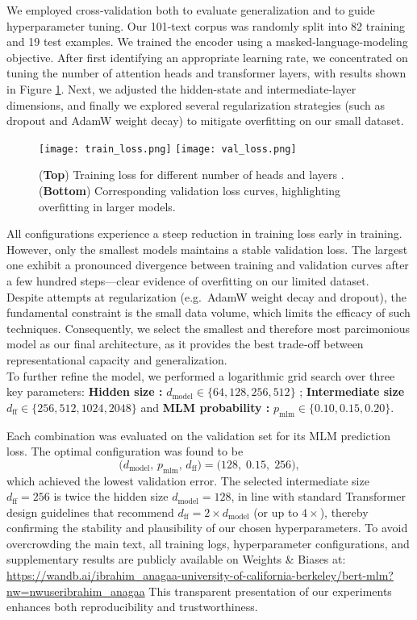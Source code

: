 \documentclass{article}
\begin{document}
We employed cross‐validation both to evaluate generalization and to guide hyperparameter tuning. Our 101-text corpus was randomly split into 82 training and 19 test examples. We trained the encoder using a masked-language-modeling objective. After first identifying an appropriate learning rate, we concentrated on tuning the number of attention heads and transformer layers, with results shown in Figure \ref{fig:loss}. Next, we adjusted the hidden-state and intermediate-layer dimensions, and finally we explored several regularization strategies (such as dropout and AdamW weight decay) to mitigate overfitting on our  small dataset.

\begin{figure}[H]
  \centering
  \texttt{[image: train\_loss.png]}
  \texttt{[image: val\_loss.png]}
  \caption{(\textbf{Top}) Training loss for different number of heads and layers . (\textbf{Bottom}) Corresponding validation loss curves, highlighting overfitting in larger models.}
  \label{fig:loss}
\end{figure}

All configurations experience a steep reduction in training loss early in training.  However, only the smallest models maintains a stable validation loss.  The largest one exhibit a pronounced divergence between training and validation curves after a few hundred steps—clear evidence of overfitting on our limited dataset. \\

Despite attempts at regularization (e.g.\ AdamW weight decay and dropout), the fundamental constraint is the small data volume, which limits the efficacy of such techniques.  Consequently, we select the smallest and therefore most parcimonious model as our final architecture, as it provides the best trade‐off between representational capacity and generalization. \\


To further refine the model, we performed a logarithmic grid search over three key parameters:  
\textbf{Hidden size : } $d_{\mathrm{model}}\in\{64,128,256,512\}$ ; \textbf{Intermediate size }$d_{\mathrm{ff}}\in\{256,512,1024,2048\}$ and \textbf{MLM probability : }$p_{\mathrm{mlm}}\in\{0.10,0.15,0.20\}.$



Each combination was evaluated on the validation set for its MLM prediction loss.  The optimal configuration was found to be
\[
\bigl(d_{\mathrm{model}},\,p_{\mathrm{mlm}},\,d_{\mathrm{ff}}\bigr)
=\bigl(128,\;0.15,\;256\bigr),
\]
which achieved the lowest validation error. The selected intermediate size \(d_{\mathrm{ff}}=256\) is twice the hidden size \(d_{\mathrm{model}}=128\), in line with standard Transformer design guidelines that recommend \(d_{\mathrm{ff}}=2\times d_{\mathrm{model}}\) (or up to \(4\times\)), thereby confirming the stability and plausibility of our chosen hyperparameters. To avoid overcrowding the main text, all training logs, hyperparameter configurations, and supplementary results are publicly available on Weights \& Biases at:
\noindent\url{https://wandb.ai/ibrahim_anagaa-university-of-california-berkeley/bert-mlm?nw=nwuseribrahim_anagaa}
This transparent presentation of our experiments enhances both reproducibility and trustworthiness.
\end{document}
